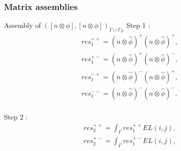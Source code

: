 \documentclass{beamer}
\begin{document}
\begin{frame}
\frametitle{Matrix assemblies}
\begin{block}{Assembly of $([n \otimes \phi], [n \otimes \phi])_{\Gamma \cup \Gamma_D}$}
Step 1 :
\begin{equation}
\begin{split}
res_1^{++} = (n \otimes \hat{\phi})^+ (n \otimes \hat{\phi})^+ \textrm{,}\\
res_1^{+-} = (n \otimes \hat{\phi})^+ (n \otimes \hat{\phi})^- \textrm{,}\\
res_1^{-+} = (n \otimes \hat{\phi})^- (n \otimes \hat{\phi})^+ \textrm{,}\\
res_1^{--} = (n \otimes \hat{\phi})^- (n \otimes \hat{\phi})^- \textrm{.}\\
\end{split}
\end{equation}
 
Step 2 : 
\begin{equation}
\begin{split}
res_2^{++} = \int_{\Gamma} res_1^{++} EL(i,j) \textrm{,}\\
res_2^{+-} = \int_{\Gamma} res_1^{+-} EL(i,j) \textrm{,}\\
\end{split}
\end{equation}
\end{block}
\end{frame}
\end{document}
